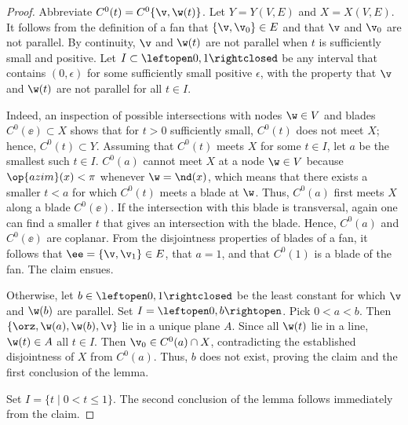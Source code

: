 \begin{proof}
Abbreviate $C^0(t) = C^0\{\v,\w(t)\}$.
Let $Y = Y(V,E)$ and $X = X(V,E)$.
It follows from the definition of a fan that $\{\v,\v_0\}\in E$ and
that $\v$ and $\v_0$ are not parallel.  By continuity, $\v$ and $\w(t)$
are not parallel when $t$ is sufficiently small and positive.  
Let $I\subset\leftopen0,1\rightclosed$ be any interval that contains
$(0,\epsilon)$ for some sufficiently small positive $\epsilon$, with the
property that $\v$ and $\w(t)$ are not parallel for all $t\in I$.

  Indeed, an inspection of possible
intersections with nodes $\w\in V$ and blades $C^0(\ee)\subset X$
shows that for $t>0$ sufficiently small, $C^0(t)$ does not meet $X$;
hence, $C^0(t)\subset Y$.  Assuming that $C^0(t)$ meets $X$ for some
$t\in I$, let $a$ be the smallest such $t\in I$.  $C^0(a)$ cannot meet
$X$ at a node $\w\in V$ because $\op{azim}(x)<\pi$ whenever
$\w=\nd(x)$, which means that
there exists a smaller $t<a$ for which $C^0(t)$ meets a blade at $\w$.
Thus, $C^0(a)$ first meets $X$ along a blade $C^0(\ee)$. If the
intersection with this blade is transversal, again one can find a
smaller $t$ that gives an intersection with the blade.  Hence,
$C^0(a)$ and $C^0(\ee)$ are coplanar.  From the disjointness
properties of blades of a fan, it follows that $\ee = \{\v,\v_1\}\in
E$, that $a=1$, and that $C^0(1)$ is a blade of the fan.  The claim
ensues.

  Otherwise, let $b\in
\leftopen0,1\rightclosed$ be the least constant for which $\v$ and
$\w(b)$ are parallel.  Set  $I=\leftopen0,b\rightopen$.  
Pick $0<a<b$.  Then $\{\orz,\w(a),\w(b),\v\}$ lie in a unique plane
$A$.  Since all $\w(t)$ lie in a line, $\w(t)\in A$ all $t\in I$.
Then $\v_0\in C^0(a)\cap X$, contradicting the established
disjointness of $X$ from $C^0(a)$.  Thus, $b$ does not exist, proving
 the claim and the first conclusion of the lemma.

Set $I= \{t\mid 0 < t \le 1\}$.  The second conclusion of the lemma
follows immediately from the claim.
\end{proof}


